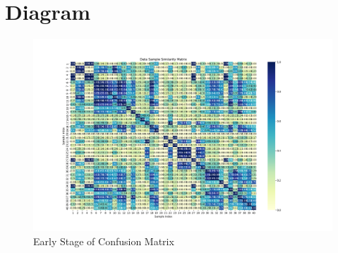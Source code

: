 \chapter{Diagram}
\label{ap:sample-fingerprint-images}
\thispagestyle{fancy}

\begin{figure}
  \centering \includegraphics[width=\textwidth]{appendix/confusion_matrix_p2.png}
  \caption{Early Stage of Confusion Matrix}
  \label{fig:early-stage-of-confusion-matrix}
\end{figure}
